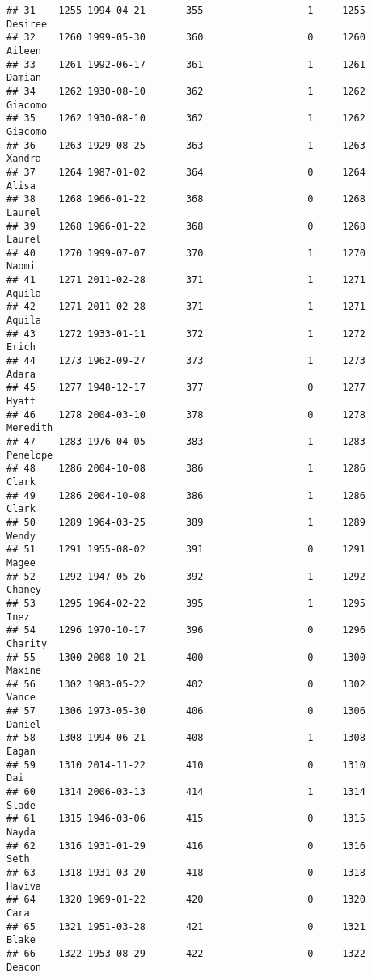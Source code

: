 \documentclass[
]{article}
\begin{document}
\begin{verbatim}
## 31    1255 1994-04-21       355                  1     1255    Desiree
## 32    1260 1999-05-30       360                  0     1260     Aileen
## 33    1261 1992-06-17       361                  1     1261     Damian
## 34    1262 1930-08-10       362                  1     1262    Giacomo
## 35    1262 1930-08-10       362                  1     1262    Giacomo
## 36    1263 1929-08-25       363                  1     1263     Xandra
## 37    1264 1987-01-02       364                  0     1264      Alisa
## 38    1268 1966-01-22       368                  0     1268     Laurel
## 39    1268 1966-01-22       368                  0     1268     Laurel
## 40    1270 1999-07-07       370                  1     1270      Naomi
## 41    1271 2011-02-28       371                  1     1271     Aquila
## 42    1271 2011-02-28       371                  1     1271     Aquila
## 43    1272 1933-01-11       372                  1     1272      Erich
## 44    1273 1962-09-27       373                  1     1273      Adara
## 45    1277 1948-12-17       377                  0     1277      Hyatt
## 46    1278 2004-03-10       378                  0     1278   Meredith
## 47    1283 1976-04-05       383                  1     1283   Penelope
## 48    1286 2004-10-08       386                  1     1286      Clark
## 49    1286 2004-10-08       386                  1     1286      Clark
## 50    1289 1964-03-25       389                  1     1289      Wendy
## 51    1291 1955-08-02       391                  0     1291      Magee
## 52    1292 1947-05-26       392                  1     1292     Chaney
## 53    1295 1964-02-22       395                  1     1295       Inez
## 54    1296 1970-10-17       396                  0     1296    Charity
## 55    1300 2008-10-21       400                  0     1300     Maxine
## 56    1302 1983-05-22       402                  0     1302      Vance
## 57    1306 1973-05-30       406                  0     1306     Daniel
## 58    1308 1994-06-21       408                  1     1308      Eagan
## 59    1310 2014-11-22       410                  0     1310        Dai
## 60    1314 2006-03-13       414                  1     1314      Slade
## 61    1315 1946-03-06       415                  0     1315      Nayda
## 62    1316 1931-01-29       416                  0     1316       Seth
## 63    1318 1931-03-20       418                  0     1318     Haviva
## 64    1320 1969-01-22       420                  0     1320       Cara
## 65    1321 1951-03-28       421                  0     1321      Blake
## 66    1322 1953-08-29       422                  0     1322     Deacon

\end{verbatim}
\end{document}
